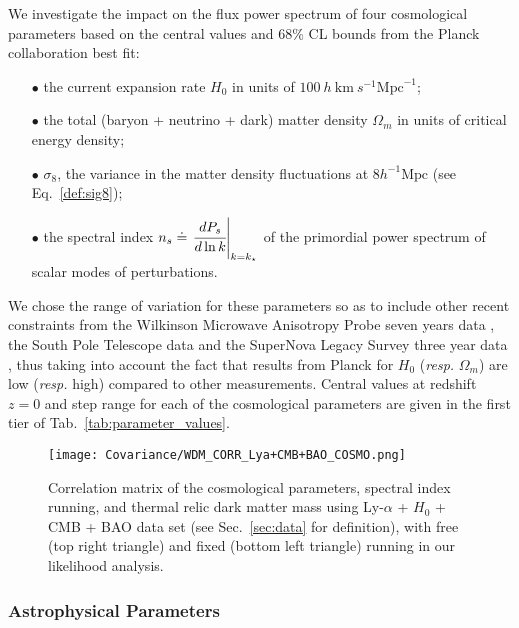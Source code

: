 We investigate the impact on the flux power spectrum of four cosmological parameters based on the central values and $68\%$ CL bounds from the Planck collaboration best fit: \\
\begin{itemize}
\item[$\bullet$] the current expansion rate $H_0$ in units of $100~h~\mathrm{km}~s^{-1}\mathrm{Mpc}^{-1}$;\\
\item[$\bullet$] the total (baryon + neutrino + dark) matter density $\Omega_m$ in units of critical energy density; \\
\item[$\bullet$] $\sigma_8$, the variance in the matter density fluctuations at $8 h^{-1}\mathrm{Mpc}$ (see Eq.~\ref{def:sig8});\\
\item[$\bullet$] the spectral index $n_s \doteq \left.\cfrac{d P_s}{d \ln k}\right\vert_{k=k_\star}$ of the primordial power spectrum of scalar modes of perturbations.\\
\end{itemize}

We chose the range of variation for these parameters so as to include other recent constraints from the Wilkinson Microwave
Anisotropy Probe seven years data \citep{Komatsu2011}, the South Pole Telescope data \citep{Hou2012} and the SuperNova Legacy Survey
three year data \citep{Conley2011, Sullivan2011}, thus taking into account the fact that results from Planck for $H_0$ (\textit{resp.}
$\Omega_m$) are low (\textit{resp.} high) compared to other measurements. Central values at redshift $z=0$ and step range for each of the cosmological parameters are given in the first tier of Tab.~\ref{tab:parameter_values}.  

\begin{figure}
\begin{center}
\texttt{[image: Covariance/WDM\_CORR\_Lya+CMB+BAO\_COSMO.png]}
\caption{Correlation matrix of the cosmological parameters, spectral index running, and thermal relic dark matter mass using Ly-$\alpha$ + $H_0$ + CMB + BAO data set (see Sec.~\ref{sec:data} for definition), with free (top right triangle) and fixed (bottom left triangle) running in our likelihood analysis.}
\label{fig:C_cosmo}
\end{center}
\end{figure}


\subsubsection{Astrophysical Parameters}
\label{sec:astro_param}

